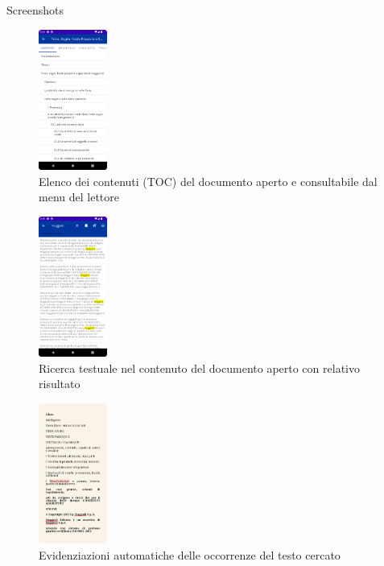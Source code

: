 \documentclass[10pt]{beamer}
\begin{document}
    \begin{frame}{Screenshots}
        \begin{multicols}{3}
            \begin{figure}[H]
                \includegraphics[width=0.2\textwidth]{toc.png}
                \caption{Elenco dei contenuti (TOC) del documento aperto e consultabile dal menu del lettore}
                \label{toc}
            \end{figure}
            
            \begin{figure}[H]
                \includegraphics[width=0.2\textwidth]{ricerca_testo.png}
                \caption{Ricerca testuale nel contenuto del documento aperto con relativo risultato}
                \label{ricerca_testo}
            \end{figure}
            
            \begin{figure}[H]
                \includegraphics[width=0.2\textwidth]{ricerca_testo2.png}
                \caption{Evidenziazioni automatiche delle occorrenze del testo cercato}
                \label{ricerca_testo2}
            \end{figure}
        \end{multicols}
    \end{frame}
\end{document}

